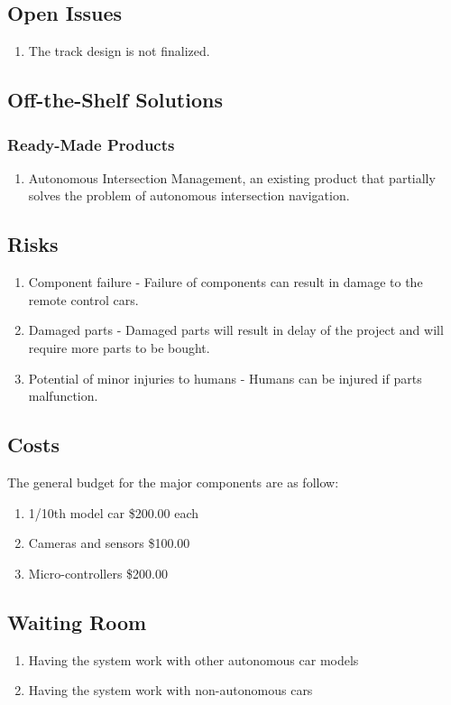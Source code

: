 \documentclass [11pt]{article}
\begin{document}
\subsection{Open Issues}
	\begin{enumerate}[label=\textbf{\Alph*}:]
		\item The track design is not finalized. 
	\end{enumerate}

\subsection{Off-the-Shelf Solutions}

\subsubsection{Ready-Made Products}
	\begin{enumerate}[label=\textbf{\Alph*}:]
		\item Autonomous Intersection Management, an existing product that partially solves the problem of autonomous intersection navigation. 
	\end{enumerate}


\subsection{Risks}
	\begin{enumerate}[label=\textbf{\Alph*}:]
		\item Component failure - Failure of components can result in damage to the remote control cars.
		\item Damaged parts - Damaged parts will result in delay of the project and will require more parts to be bought.
		\item Potential of minor injuries to humans - Humans can be injured if parts malfunction. 
	\end{enumerate}
	

	
\subsection{Costs}	
		
		The general budget for the major components are as follow:

		\begin{enumerate}[label=\textbf{\Alph*}:]
			\item 1/10th model car \$200.00 each
			\item Cameras and sensors \$100.00
			\item Micro-controllers \$200.00
		\end{enumerate}


\subsection{Waiting Room}
	\begin{enumerate}[label=\textbf{\Alph*}:]
		\item Having the system work with other autonomous car models
		\item Having the system work with non-autonomous cars
	\end{enumerate} 
\end{document}
